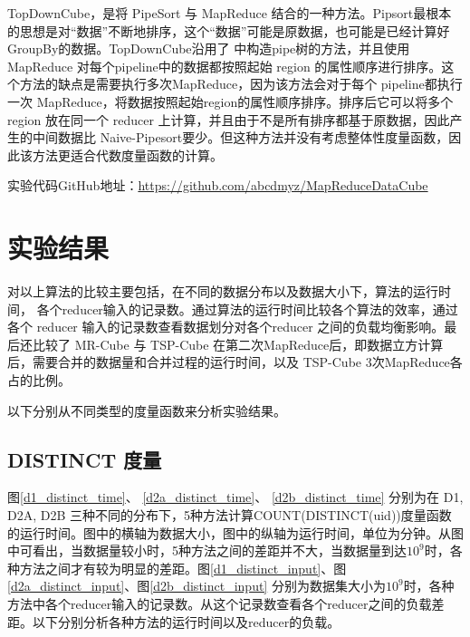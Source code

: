 TopDownCube，是将 PipeSort 与 MapReduce 结合的一种方法。Pipsort最根本的思想是对``数据”不断地排序，这个``数据”可能是原数据，也可能是已经计算好GroupBy的数据。TopDownCube沿用了\cite{agarwal1996computation} 中构造pipe树的方法，并且使用 MapReduce 对每个pipeline中的数据都按照起始 region 的属性顺序进行排序。这个方法的缺点是需要执行多次MapReduce，因为该方法会对于每个 pipeline都执行一次 MapReduce，将数据按照起始region的属性顺序排序。排序后它可以将多个 region 放在同一个 reducer 上计算，并且由于不是所有排序都基于原数据，因此产生的中间数据比 Naive-Pipesort要少。但这种方法并没有考虑整体性度量函数，因此该方法更适合代数度量函数的计算。

实验代码GitHub地址：\url{https://github.com/abcdmyz/MapReduceDataCube}

\section{实验结果}

对以上算法的比较主要包括，在不同的数据分布以及数据大小下，算法的运行时间， 各个reducer输入的记录数。通过算法的运行时间比较各个算法的效率，通过各个 reducer 输入的记录数查看数据划分对各个reducer 之间的负载均衡影响。最后还比较了 MR-Cube 与 TSP-Cube 在第二次MapReduce后，即数据立方计算后，需要合并的数据量和合并过程的运行时间，以及 TSP-Cube 3次MapReduce各占的比例。

以下分别从不同类型的度量函数来分析实验结果。

\subsection{DISTINCT 度量}


图\ref{d1_distinct_time}、 \ref{d2a_distinct_time}、 \ref{d2b_distinct_time} 分别为在 D1, D2A, D2B 三种不同的分布下，5种方法计算COUNT(DISTINCT(uid))度量函数的运行时间。图中的横轴为数据大小，图中的纵轴为运行时间，单位为分钟。从图中可看出，当数据量较小时，5种方法之间的差距并不大，当数据量到达${10}^{9}$时，各种方法之间才有较为明显的差距。图\ref{d1_distinct_input}、图\ref{d2a_distinct_input}、图\ref{d2b_distinct_input} 分别为数据集大小为${10}^{9}$时，各种方法中各个reducer输入的记录数。从这个记录数查看各个reducer之间的负载差距。以下分别分析各种方法的运行时间以及reducer的负载。

